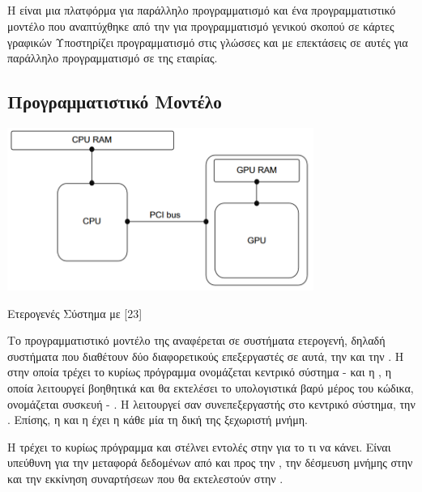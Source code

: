 \subsection{}
Η  είναι μια πλατφόρμα για παράλληλο προγραμματισμό και ένα προγραμματιστικό μοντέλο που αναπτύχθηκε από την  για προγραμματισμό γενικού σκοπού σε κάρτες γραφικών  Υποστηρίζει προγραμματισμό στις γλώσσες  και  με επεκτάσεις σε αυτές για παράλληλο προγραμματισμό σε  της εταιρίας.

\subsection{Προγραμματιστικό Μοντέλο}

\begin{Illustration}[!h] 
	\centering
	\includegraphics[width=0.75\textwidth]{images/image047.png} 
	\caption{Ετερογενές Σύστημα με  [23]}
	\label{image-3.4}
\end{Illustration}

Το προγραμματιστικό μοντέλο της  αναφέρεται σε συστήματα ετερογενή, δηλαδή συστήματα που διαθέτουν δύο διαφορετικούς επεξεργαστές σε αυτά, την  και την . Η  στην οποία τρέχει το κυρίως πρόγραμμα ονομάζεται κεντρικό σύστημα -  και η , η οποία λειτουργεί βοηθητικά και θα εκτελέσει το υπολογιστικά βαρύ μέρος του κώδικα, ονομάζεται συσκευή - . Η  λειτουργεί σαν συνεπεξεργαστής στο κεντρικό σύστημα, την . Επίσης, η  και η  έχει η κάθε μία τη δική της ξεχωριστή μνήμη. 

Η  τρέχει το κυρίως πρόγραμμα και στέλνει εντολές στην  για το τι να κάνει. Είναι υπεύθυνη για την μεταφορά δεδομένων από και προς την , την δέσμευση μνήμης στην  και την εκκίνηση συναρτήσεων που θα εκτελεστούν στην .

